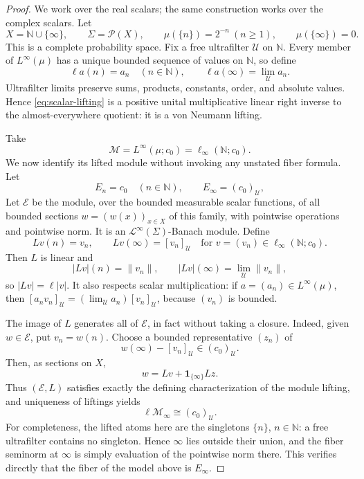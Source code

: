 \documentclass[11pt]{amsart}
\newcommand{\N}{\mathbb N}
\newcommand{\U}{\mathcal U}
\begin{document}
\begin{proof}
We work over the real scalars; the same construction works over the complex
scalars.  Let
\[
 X=\N\cup\{\infty\},\qquad \Sigma=\mathcal P(X),\qquad
 \mu(\{n\})=2^{-n}\ (n\geq1),\qquad \mu(\{\infty\})=0.
\]
This is a complete probability space.  Fix a free ultrafilter $\U$ on $\N$.
Every member of $L^\infty(\mu)$ has a unique bounded sequence of values on
$\N$, so define
\begin{equation}\label{eq:scalar-lifting}
 \ell a(n)=a_n\quad(n\in\N),
 \qquad
 \ell a(\infty)=\lim_{\U}a_n.
\end{equation}
Ultrafilter limits preserve sums, products, constants, order, and absolute
values.  Hence \eqref{eq:scalar-lifting} is a positive unital multiplicative
linear right inverse to the almost-everywhere quotient: it is a von Neumann
lifting.

Take
\[
  \mathscr M=L^\infty(\mu;c_0)=\ell_\infty(\N;c_0).
\]
We now identify its lifted module without invoking any unstated fiber formula.
Let
\[
 E_n=c_0\quad(n\in\N),
 \qquad E_\infty=(c_0)_\U,
\]
Let $\mathscr E$ be the module, over the bounded measurable scalar functions,
of all bounded sections $w=(w(x))_{x\in X}$ of this family, with pointwise
operations and pointwise norm.  It is an
$\mathcal L^\infty(\Sigma)$-Banach module.  Define
\begin{equation}\label{eq:vector-lifting}
 Lv(n)=v_n,
 \qquad Lv(\infty)=[v_n]_\U
 \quad\text{for }v=(v_n)\in\ell_\infty(\N;c_0).
\end{equation}
Then $L$ is linear and
\[
  |Lv|(n)=\|v_n\|,
  \qquad |Lv|(\infty)=\lim_\U\|v_n\|,
\]
so $|Lv|=\ell|v|$.  It also respects scalar multiplication: if
$a=(a_n)\in L^\infty(\mu)$, then
$[a_nv_n]_\U=(\lim_\U a_n)[v_n]_\U$, because $(v_n)$ is bounded.

The image of $L$ generates all of $\mathscr E$, in fact without taking a
closure.  Indeed, given $w\in\mathscr E$, put $v_n=w(n)$.  Choose a bounded
representative $(z_n)$ of
\[
  w(\infty)-[v_n]_\U\in(c_0)_\U.
\]
Then, as sections on $X$,
\[
  w=Lv+\mathbf 1_{\{\infty\}}Lz.
\]
Thus $(\mathscr E,L)$ satisfies exactly the defining characterization of the
module lifting, and uniqueness of liftings yields
\begin{equation}\label{eq:first-fiber}
  \ell\mathscr M_\infty\cong(c_0)_\U.
\end{equation}
For completeness, the lifted atoms here are the singletons $\{n\}$,
$n\in\N$: a free ultrafilter contains no singleton.  Hence $\infty$ lies
outside their union, and the fiber seminorm at $\infty$ is simply evaluation
of the pointwise norm there.  This verifies directly that the fiber of the
model above is $E_\infty$.


\end{proof}
\end{document}
